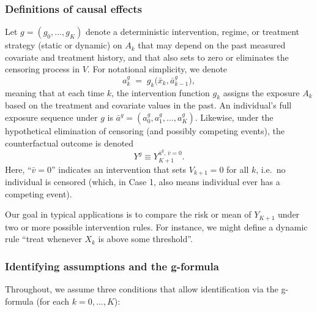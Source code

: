 \subsubsection{Definitions of causal effects}
\label{sssec:causal-effects}

Let \(g = (g_0, \ldots, g_K)\) denote a deterministic intervention, regime, or treatment strategy (static or dynamic) on \(A_k\) that may depend on the past measured covariate and treatment history, and that also sets to zero or eliminates the censoring process in \(V\).  For notational simplicity, we denote 
\[
   a^g_k \;=\; g_k\bigl(\bar{x}_k, \bar{a}^g_{k-1}\bigr),
\]
meaning that at each time \(k\), the intervention function \(g_k\) assigns the exposure \(A_k\) based on the treatment and covariate values in the past.  An individual’s full exposure sequence under \(g\) is \(\bar{a}^g = (a^g_0,a^g_1,\dots,a^g_K)\).  Likewise, under the hypothetical elimination of censoring (and possibly competing events), the counterfactual outcome is denoted
\[
  Y^g \equiv Y_{K+1}^{\bar{a}^g, \,\bar{v} = 0}.
\]
Here, “\(\bar{v} = 0\)” indicates an intervention that sets \(V_{k+1}=0\) for all \(k\), i.e.\ no individual is censored (which, in Case 1, also means individual ever has a competing event). 

Our goal in typical applications is to compare the risk or mean of \(Y_{K+1}\) under two or more possible intervention rules.  For instance, we might define a dynamic rule “treat whenever \(X_k\) is above some threshold”.  

\subsubsection{Identifying assumptions and the g-formula}
\label{sssec:identifying}

Throughout, we assume three conditions that allow identification via the g-formula (for each \(k=0,\dots,K\)):

